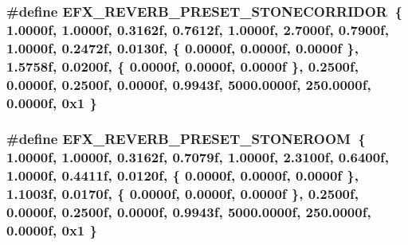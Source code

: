 \subsubsection[{\texorpdfstring{E\+F\+X\+\_\+\+R\+E\+V\+E\+R\+B\+\_\+\+P\+R\+E\+S\+E\+T\+\_\+\+S\+T\+O\+N\+E\+C\+O\+R\+R\+I\+D\+OR}{EFX_REVERB_PRESET_STONECORRIDOR}}]{\setlength{\rightskip}{0pt plus 5cm}\#define E\+F\+X\+\_\+\+R\+E\+V\+E\+R\+B\+\_\+\+P\+R\+E\+S\+E\+T\+\_\+\+S\+T\+O\+N\+E\+C\+O\+R\+R\+I\+D\+OR~\{ 1.\+0000f, 1.\+0000f, 0.\+3162f, 0.\+7612f, 1.\+0000f, 2.\+7000f, 0.\+7900f, 1.\+0000f, 0.\+2472f, 0.\+0130f, \{ 0.\+0000f, 0.\+0000f, 0.\+0000f \}, 1.\+5758f, 0.\+0200f, \{ 0.\+0000f, 0.\+0000f, 0.\+0000f \}, 0.\+2500f, 0.\+0000f, 0.\+2500f, 0.\+0000f, 0.\+9943f, 5000.\+0000f, 250.\+0000f, 0.\+0000f, 0x1 \}}\hypertarget{efx-presets_8h_a8224ffb5a04a2c06c7e2d9fe2b38a06c}{}\label{efx-presets_8h_a8224ffb5a04a2c06c7e2d9fe2b38a06c}
\subsubsection[{\texorpdfstring{E\+F\+X\+\_\+\+R\+E\+V\+E\+R\+B\+\_\+\+P\+R\+E\+S\+E\+T\+\_\+\+S\+T\+O\+N\+E\+R\+O\+OM}{EFX_REVERB_PRESET_STONEROOM}}]{\setlength{\rightskip}{0pt plus 5cm}\#define E\+F\+X\+\_\+\+R\+E\+V\+E\+R\+B\+\_\+\+P\+R\+E\+S\+E\+T\+\_\+\+S\+T\+O\+N\+E\+R\+O\+OM~\{ 1.\+0000f, 1.\+0000f, 0.\+3162f, 0.\+7079f, 1.\+0000f, 2.\+3100f, 0.\+6400f, 1.\+0000f, 0.\+4411f, 0.\+0120f, \{ 0.\+0000f, 0.\+0000f, 0.\+0000f \}, 1.\+1003f, 0.\+0170f, \{ 0.\+0000f, 0.\+0000f, 0.\+0000f \}, 0.\+2500f, 0.\+0000f, 0.\+2500f, 0.\+0000f, 0.\+9943f, 5000.\+0000f, 250.\+0000f, 0.\+0000f, 0x1 \}}\hypertarget{efx-presets_8h_a0e1d69fafcc43e8837a8e4270665a0ae}{}\label{efx-presets_8h_a0e1d69fafcc43e8837a8e4270665a0ae}
